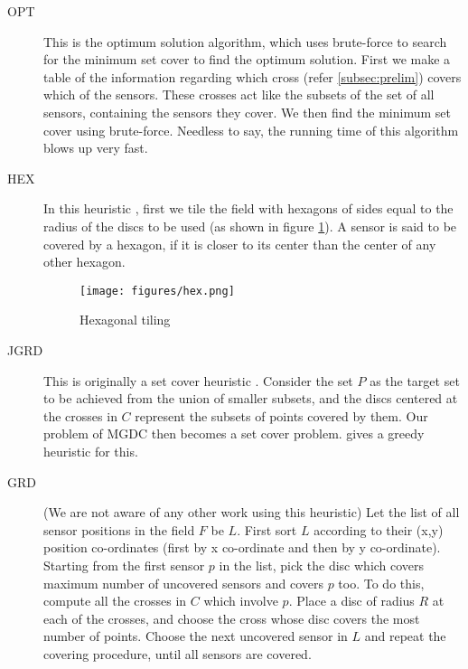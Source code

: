 \begin{description}

\item[OPT] This is the optimum solution algorithm, which uses brute-force to search for the minimum set cover to find the optimum solution. First we make a table of the information regarding which cross (refer \ref{subsec:prelim}) covers which of the sensors. These crosses act like the subsets of the set of all sensors, containing the sensors they cover. We then find the minimum set cover using brute-force. Needless to say, the running time of this algorithm blows up very fast.

\item[HEX] In this heuristic \cite{hex}, first we tile the field with hexagons of sides equal to the radius of the discs to be used (as shown in figure \ref{fig:hex}). A sensor is said to be covered by a hexagon, if it is closer to its center than the center of any other hexagon.
\begin{center}
\begin{figure}[H]
\texttt{[image: figures/hex.png]}
\caption{Hexagonal tiling}\label{fig:hex}
\end{figure}
\end{center}

\item[JGRD] This is originally a set cover heuristic \cite{jgreedy}. Consider the set $P$ as the target set to be achieved from the union of smaller subsets, and the discs centered at the crosses in $C$ represent the subsets of points covered by them. Our problem of MGDC then becomes a set cover problem. \cite{jgreedy} gives a greedy heuristic for this.

\item[GRD] (We are not aware of any other work using this heuristic) Let the list of all sensor positions in the field $F$ be $L$. First sort $L$ according to their (x,y) position co-ordinates (first by x co-ordinate and then by y co-ordinate). Starting from the first sensor $p$ in the list, pick the disc which covers maximum number of uncovered sensors and covers $p$ too. To do this, compute all the crosses in $C$ which involve $p$. Place a disc of radius $R$ at each of the crosses, and choose the cross whose disc covers the most number of points. Choose the next uncovered sensor in $L$ and repeat the covering procedure, until all sensors are covered.


\end{description}
